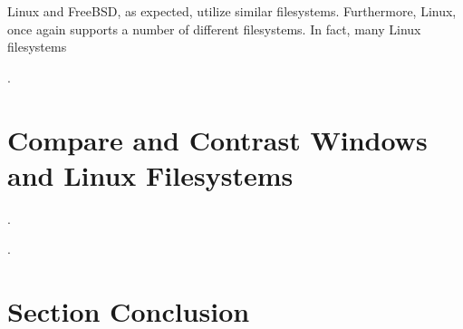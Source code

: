 \documentclass[letterpaper,10pt,draftclsnofoot,onecolumn]{IEEEtran}
\begin{document}
\noindent Linux and FreeBSD, as expected, utilize similar filesystems. Furthermore, Linux, once again supports a number of different filesystems. In fact, many Linux filesystems





\cite{Linux1FS} \cite{Linux2FS}.\\

%    

\section{Compare and Contrast Windows and Linux Filesystems}
\noindent 




\cite{MSWindows1FS} \cite{MSWindows2FS}.\\

\noindent 



\cite{Linux1FS} \cite{Linux2FS}.\\

\section{Section Conclusion}
\noindent 

\newpage


\end{document}
